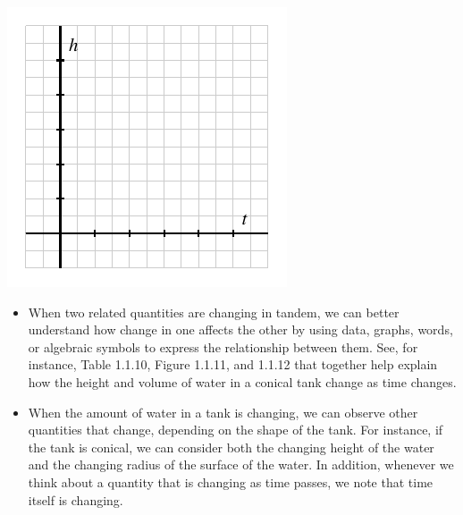 \documentclass{ximera}
\begin{document}
\begin{exploration}
\begin{enumerate}[label=\alph*.]
\begin{image}
\includegraphics{tandem-h-t-blank-axes.pdf}
\end{image}

\end{enumerate}
\end{exploration}

\begin{summary}
  \begin{itemize}
\item When two related quantities are changing in tandem, we can
  better understand how change in one affects the other by using data,
  graphs, words, or algebraic symbols to express the relationship
  between them. See, for instance, Table 1.1.10, Figure 1.1.11, and
  1.1.12 that together help explain how the height and volume of water
  in a conical tank change as time changes.
\item When the amount of water in a tank is changing, we can observe
  other quantities that change, depending on the shape of the tank.
  For instance, if the tank is conical, we can consider both the
  changing height of the water and the changing radius of the surface
  of the water.  In addition, whenever we think about a quantity that
  is changing as time passes, we note that time itself is changing.
  \end{itemize}
\end{summary}
\end{document}
